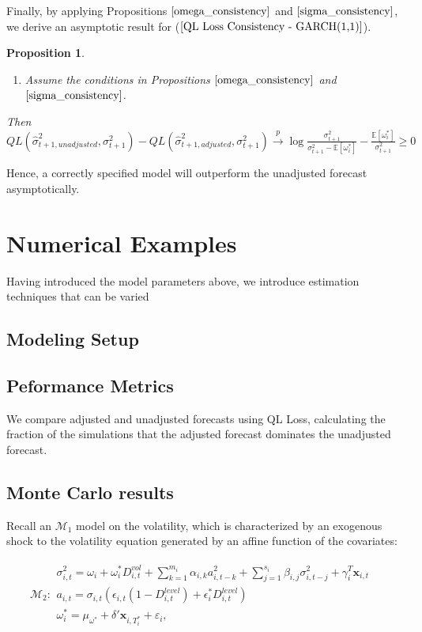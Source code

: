 \documentclass[11pt]{article}
\newcommand{\x}{\textbf{x}}
\def\mbf#1{\mathbf{#1}} %
\def\mc#1{\mathcal{#1}} %
\def\E{\mathbb{E}} %
\def\mc#1{\mathcal{#1}}
\newtheorem{prop}{Proposition}
\theoremstyle{definition}
\begin{document}
Finally, by applying Propositions $\ref{omega_consistency}$ and $\ref{sigma_consistency}$, we derive an asymptotic result for ($\ref{QL Loss Consistency - GARCH(1,1)}$).

\begin{prop}\label{asymptotic_consistency}
  \begin{enumerate}
    \item Assume the conditions in Propositions $\ref{omega_consistency}$ and $\ref{sigma_consistency}$.
  \end{enumerate}
  Then $QL(\hat\sigma_{t+1, unadjusted}^{2},\sigma^{2}_{t+1})-QL(\hat\sigma^{2}_{t+1, adjusted},\sigma^{2}_{t+1})\xrightarrow{p} \log{\frac{\sigma^{2}_{t+1}}{\sigma_{t+1}^{2}-\E[\omega_{i}^{*}]}} - \frac{\E[\omega_{i}^{*}]}{\sigma^{2}_{t+1}} \geq 0 \label{QL Loss Consistency - GARCH(1,1)}$
\end{prop}

Hence, a correctly specified model will outperform the unadjusted forecast asymptotically.

\section{Numerical Examples}

Having introduced the model parameters above, we introduce estimation techniques that can be varied

\subsection{Modeling Setup}

\subsection{Peformance Metrics}
We compare adjusted and unadjusted forecasts using QL Loss, calculating the fraction of the simulations that the adjusted forecast dominates the unadjusted forecast.

\subsection{Monte Carlo results}
Recall an $\mc{M}_1$ model on the volatility, which is characterized by an exogenous shock to the volatility equation generated by an affine function of the covariates:

\begin{align*}
\mc{M}_2 \colon \begin{array}{l}
   \sigma^{2}_{i,t} = \omega_{i} + \omega^{*}_i D^{vol}_{i,t} + \sum^{m_{i}}_{k=1}\alpha_{i,k}a^{2}_{i,t-k} + \sum_{j=1}^{s_{i}}\beta_{i,j}\sigma_{i,t-j}^{2} + \gamma_{i}^{T} \x_{i,t} \text{ }\\[.2cm]
   a_{i,t} = \sigma_{i,t}(\epsilon_{i,t}(1-D^{level}_{i,t}) + \epsilon^{*}_{i}D^{level}_{i,t})\\[.2cm]
   \omega_i^{*} = \mu_{\omega^{*}}+\delta'\mbf{x}_{i, T_i^*}+ \varepsilon_{i},
\end{array}
\end{align*}
\end{document}
